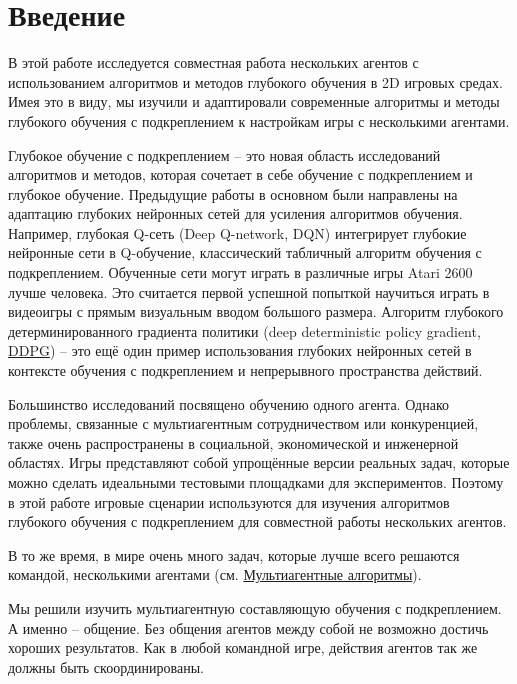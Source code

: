 \chapter*{Введение} \label{intro}%

В этой работе исследуется совместная работа нескольких агентов с использованием алгоритмов и методов глубокого обучения в 2D игровых средах. Имея это в виду, мы изучили и адаптировали современные алгоритмы и методы глубокого обучения с подкреплением к настройкам игры с несколькими агентами.

Глубокое обучение с подкреплением -- это новая область исследований алгоритмов и методов, которая сочетает в себе обучение с подкреплением и глубокое обучение. Предыдущие работы в основном были направлены на адаптацию глубоких нейронных сетей для усиления алгоритмов обучения. Например, глубокая Q-сеть (Deep Q-network, DQN) \cite{Mnih2015} интегрирует глубокие нейронные сети в Q-обучение, классический табличный алгоритм обучения с подкреплением. Обученные сети могут играть в различные игры Atari 2600 \cite{Bellemare_2013} лучше человека. Это считается первой успешной попыткой научиться играть в видеоигры с прямым визуальным вводом большого размера. Алгоритм глубокого детерминированного градиента политики (deep deterministic policy gradient, \hyperref[acr:ddpg]{DDPG}) \cite{lillicrap2015continuous} -- это ещё один пример использования глубоких нейронных сетей в контексте обучения с подкреплением и непрерывного пространства действий.

Большинство исследований посвящено обучению одного агента. Однако проблемы, связанные с мультиагентным сотрудничеством или конкуренцией, также очень распространены в социальной, экономической и инженерной областях. Игры представляют собой упрощённые версии реальных задач, которые можно сделать идеальными тестовыми площадками для экспериментов. Поэтому в этой работе игровые сценарии используются для изучения алгоритмов глубокого обучения с подкреплением для совместной работы нескольких агентов.

В то же время, в мире очень много задач, которые лучше всего решаются командой, несколькими агентами (см. \hyperref[ch2:ma-algs]{Мультиагентные алгоритмы}).

Мы решили изучить мультиагентную составляющую обучения с подкреплением. А именно -- общение. Без общения агентов между собой не возможно достичь хороших результатов. Как в любой командной игре, действия агентов так же должны быть скоординированы.

